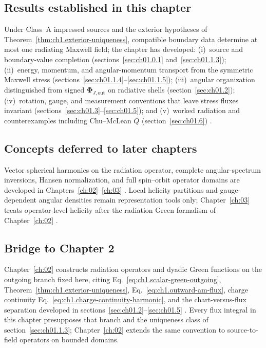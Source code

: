 \subsection{Results established in this chapter}
\label{sec:ch01.7.1}

Under Class~A impressed sources and the exterior hypotheses of Theorem~\ref{thm:ch1.exterior-uniqueness}, compatible boundary data determine at most one radiating Maxwell field; the chapter has developed: (i)~source and boundary-value completion (sections~\ref{sec:ch01.0.1} and~\ref{sec:ch01.1.3}); (ii)~energy, momentum, and angular-momentum transport from the symmetric Maxwell stress (sections~\ref{sec:ch01.1.4}--\ref{sec:ch01.1.5}); (iii)~angular organization distinguished from signed $\boldsymbol{\Phi}_{J,\mathrm{out}}$ on radiative shells (section~\ref{sec:ch01.2}); (iv)~rotation, gauge, and measurement conventions that leave stress fluxes invariant (sections~\ref{sec:ch01.3}--\ref{sec:ch01.5}); and (v)~worked radiation and counterexamples including Chu--McLean $Q$ (section~\ref{sec:ch01.6}) \cite{stratton1941,beth1936,chu1948,mcclean1996}.

\subsection{Concepts deferred to later chapters}
\label{sec:ch01.7.2}

Vector spherical harmonics on the radiation operator, complete angular-spectrum inversions, Hansen normalization, and full spin--orbit operator domains are developed in Chapters~\ref{ch:02}--\ref{ch:03} \cite{hansen1988,stratton1941}. Local helicity partitions and gauge-dependent angular densities remain representation tools only; Chapter~\ref{ch:03} treats operator-level helicity after the radiation Green formalism of Chapter~\ref{ch:02} \cite{belinfante1940,tai1994}.

\subsection{Bridge to Chapter 2}
\label{sec:ch01.7.3}

Chapter~\ref{ch:02} constructs radiation operators and dyadic Green functions on the outgoing branch fixed here, citing Eq.~\eqref{eq:ch1.scalar-green-outgoing}, Theorem~\ref{thm:ch1.exterior-uniqueness}, Eq.~\eqref{eq:ch1.outward-am-flux}, charge continuity Eq.~\eqref{eq:ch1.charge-continuity-harmonic}, and the chart-versus-flux separation developed in sections~\ref{sec:ch01.2}--\ref{sec:ch01.5} \cite{harrington2001,tai1994,stratton1941}. Every flux integral in this chapter presupposes that branch and the uniqueness class of section~\ref{sec:ch01.1.3}; Chapter~\ref{ch:02} extends the same convention to source-to-field operators on bounded domains.




